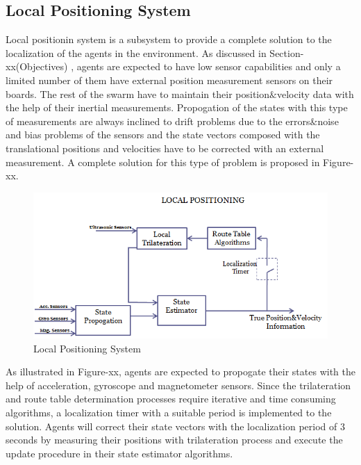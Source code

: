 \documentclass[twoside]{article}
\begin{document}
\subsection{Local Positioning System}

Local positionin system is a subsystem to provide a complete solution to the localization of the agents in the environment. As discussed in Section-xx(Objectives) , agents are expected to have low sensor capabilities and only a limited number of them have external position measurement sensors on their boards. The rest of the swarm have to maintain their position$\&$velocity data with the help of their inertial measurements. Propogation of the states with this type of measurements are always inclined to drift problems due to the errors$\&$noise and bias problems of the sensors and the state vectors composed with the translational positions and velocities have to be corrected with an external measurement. A complete solution for this type of problem is proposed in Figure-xx. 



\begin{figure}[H]
	\caption{Local Positioning System}
	\centering
	\includegraphics[scale = 0.65]{lps}
\end{figure}


As illustrated in Figure-xx, agents are expected to propogate their states with the help of acceleration, gyroscope and magnetometer sensors. Since the trilateration and route table determination processes require iterative and time consuming algorithms, a localization timer with a suitable period is implemented to the solution. Agents will correct their state vectors with the localization period of 3 seconds by measuring their positions with trilateration process and execute the update procedure in their state estimator algorithms. 
\end{document}
